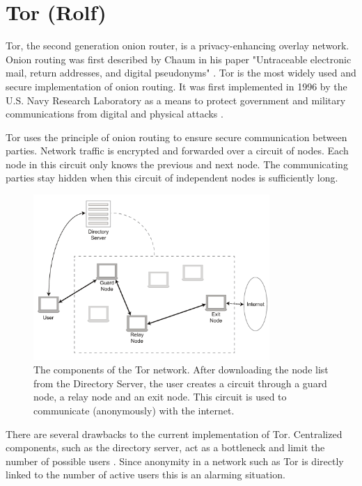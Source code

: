 \documentclass[11pt]{article}
\begin{document}
\pagebreak
\section{Tor (Rolf)}
	Tor, the second generation onion router, is a privacy-enhancing overlay network. Onion routing was first described by Chaum in his paper "Untraceable electronic mail, return addresses, and digital pseudonyms" \cite{chaum1981untraceable}. Tor is the most widely used and secure implementation of onion routing. It was first implemented in 1996 by the U.S. Navy Research Laboratory as a means to protect government and military communications from digital and physical attacks \cite{goldschlag1996hiding}.
	
	Tor uses the principle of onion routing to ensure secure communication between parties. Network traffic is encrypted and forwarded over a circuit of nodes. Each node in this circuit only knows the previous and next node. The communicating parties stay hidden when this circuit of independent nodes is sufficiently long.
	
	\begin{figure}[!t]
		\centering
		\includegraphics[width=0.8\textwidth]{graphics/tor.pdf}
		\caption{The components of the Tor network. After downloading the node list from the Directory Server, the user creates a circuit through a guard node, a relay node and an exit node. This circuit is used to communicate (anonymously) with the internet.}
		\label{fig:tor_layout}
	\end{figure}
	
	There are several drawbacks to the current implementation of Tor. Centralized components, such as the directory server, act as a bottleneck and limit the number of possible users \cite{jagerman2014fifteen}. Since anonymity in a network such as Tor is directly linked to the number of active users this is an alarming situation.
	
\end{document}
